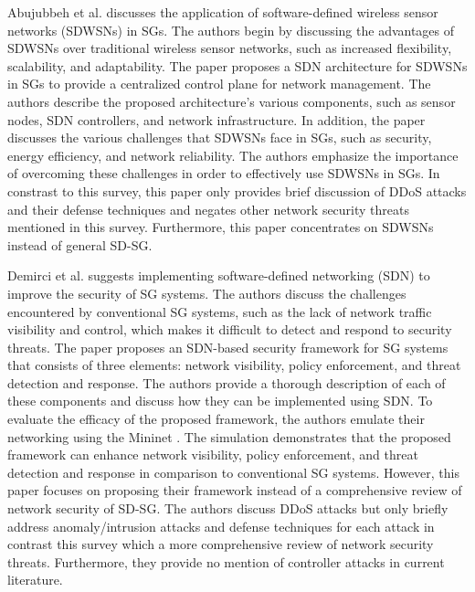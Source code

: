 \documentclass[conference]{IEEEtran}
\begin{document}
Abujubbeh et al. \cite{abujubbeh2019software} discusses the application of software-defined wireless sensor networks (SDWSNs) in SGs. The authors begin by discussing the advantages of SDWSNs over traditional wireless sensor networks, such as increased flexibility, scalability, and adaptability. The paper proposes a  SDN architecture for SDWSNs in SGs to provide a centralized control plane for network management. The authors describe the proposed architecture's various components, such as sensor nodes, SDN controllers, and network infrastructure. In addition, the paper discusses the various challenges that SDWSNs face in SGs, such as security, energy efficiency, and network reliability. The authors emphasize the importance of overcoming these challenges in order to effectively use SDWSNs in SGs. In constrast to this survey, this paper only provides brief discussion of DDoS attacks and their defense techniques and negates other network security threats mentioned in this survey. Furthermore, this paper concentrates on SDWSNs instead of general SD-SG.

Demirci et al. \cite{demirci2018software} suggests implementing software-defined networking (SDN) to improve the security of SG systems. The authors discuss the challenges encountered by conventional SG systems, such as the lack of network traffic visibility and control, which makes it difficult to detect and respond to security threats. The paper proposes an SDN-based security framework for SG systems that consists of three elements: network visibility, policy enforcement, and threat detection and response. The authors provide a thorough description of each of these components and discuss how they can be implemented using SDN. To evaluate the efficacy of the proposed framework, the authors emulate their networking using the Mininet \cite{de2014using}. The simulation demonstrates that the proposed framework can enhance network visibility, policy enforcement, and threat detection and response in comparison to conventional SG systems. However, this paper focuses on proposing their framework instead of a comprehensive review of network security of SD-SG. The authors discuss DDoS attacks but only briefly address anomaly/intrusion attacks and defense techniques for each attack in contrast this survey which a more comprehensive review of network security threats. Furthermore, they provide no mention of controller attacks in current literature.
\end{document}
